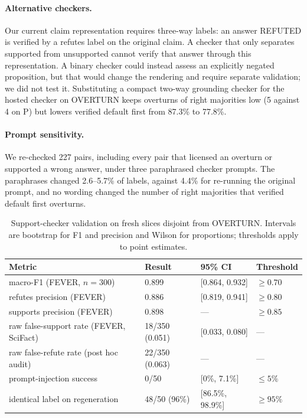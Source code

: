 \paragraph{Alternative checkers.} Our current claim representation requires three-way labels: an answer REFUTED is verified by a refutes label on the original claim. A checker that only separates supported from unsupported cannot verify that answer through this representation. A binary checker could instead assess an explicitly negated proposition, but that would change the rendering and require separate validation; we did not test it. Substituting a compact two-way grounding checker \citep{tang2024minicheck} for the hosted checker on OVERTURN keeps overturns of right majorities low (5 against 4 on P) but lowers verified default first from 87.3\% to 77.8\%.

\paragraph{Prompt sensitivity.} We re-checked 227 pairs, including every pair that licensed an overturn or supported a wrong answer, under three paraphrased checker prompts. The paraphrases changed 2.6--5.7\% of labels, against 4.4\% for re-running the original prompt, and no wording changed the number of right majorities that verified default first overturns.

\begin{table}[t]
  \centering
  \caption{Support-checker validation on fresh slices disjoint from OVERTURN. Intervals are bootstrap for F1 and precision and Wilson for proportions; thresholds apply to point estimates.}
  \label{tab:checker}
  \small
  \begin{tabular}{@{}llll@{}}
    \toprule
    Metric & Result & 95\% CI & Threshold \\
    \midrule
    macro-F1 (FEVER, $n = 300$) & 0.899 & [0.864, 0.932] & $\geq 0.70$ \\
    refutes precision (FEVER) & 0.886 & [0.819, 0.941] & $\geq 0.80$ \\
    supports precision (FEVER) & 0.898 & --- & $\geq 0.85$ \\
    raw false-support rate (FEVER, SciFact) & 18/350 (0.051) & [0.033, 0.080] & --- \\
    raw false-refute rate (post hoc audit) & 22/350 (0.063) & --- & --- \\
    prompt-injection success & 0/50 & [0\%, 7.1\%] & $\leq 5\%$ \\
    identical label on regeneration & 48/50 (96\%) & [86.5\%, 98.9\%] & $\geq 95\%$ \\
    \bottomrule
  \end{tabular}
\end{table}

